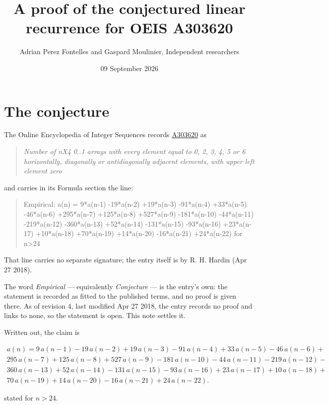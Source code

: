 \documentclass[11pt]{article}
\title{A proof of the conjectured linear recurrence for OEIS A303620}
\author{Adrian Perez Fontelles and Gaspard Moulinier, Independent researchers}
\date{09 September 2026}
\theoremstyle{definition}
\begin{document}
\maketitle
\section{The conjecture}

The Online Encyclopedia of Integer Sequences records \href{https://oeis.org/A303620}{A303620} as

\begin{quote}\itshape Number of nX4 0..1 arrays with every element equal to 0, 2, 3, 4, 5 or 6 horizontally, diagonally or antidiagonally adjacent elements, with upper left element zero\end{quote}

and carries in its Formula section the line:

\begin{quote}\ttfamily Empirical: a(n) = 9*a(n-1) -19*a(n-2) +19*a(n-3) -91*a(n-4) +33*a(n-5) -46*a(n-6) +295*a(n-7) +125*a(n-8) +527*a(n-9) -181*a(n-10) -44*a(n-11) -219*a(n-12) -360*a(n-13) +52*a(n-14) -131*a(n-15) -93*a(n-16) +23*a(n-17) +10*a(n-18) +70*a(n-19) +14*a(n-20) -16*a(n-21) +24*a(n-22) for n>24\end{quote}

That line carries no separate signature; the entry itself is by R. H. Hardin (Apr 27 2018).

The word {\itshape Empirical} --- equivalently {\itshape Conjecture} --- is the entry's own: the statement is recorded as fitted to the published terms, and no proof is given there. As of revision 4, last modified Apr 27 2018, the entry records no proof and links to none, so the statement is open. This note settles it.

Written out, the claim is

\begin{multline*} a(n) = 9\,a(n-1) - 19\,a(n-2) + 19\,a(n-3) - 91\,a(n-4) + 33\,a(n-5) - 46\,a(n-6) + \\ 295\,a(n-7) + 125\,a(n-8) + 527\,a(n-9) - 181\,a(n-10) - 44\,a(n-11) - 219\,a(n-12) - \\ 360\,a(n-13) + 52\,a(n-14) - 131\,a(n-15) - 93\,a(n-16) + 23\,a(n-17) + 10\,a(n-18) + \\ 70\,a(n-19) + 14\,a(n-20) - 16\,a(n-21) + 24\,a(n-22). \end{multline*}

stated for $n > 24$.
\end{document}
